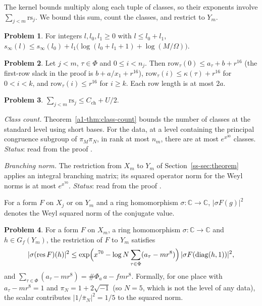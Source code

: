 \documentclass[reqno]{amsart}
\theoremstyle{definition}
\newtheorem{problem}{Problem}[section]
\theoremstyle{plain}
\theoremstyle{remark}
\newcommand{\C}{\mathbb{C}}
\newcommand{\sinf}{s_\infty}
\newcommand{\Cch}{C_{\mathrm{ch}}}
\newcommand{\row}{\mathrm{row}}
\newcommand{\diag}{\operatorname{diag}}
\newcommand{\rs}{\mathrm{rs}}
\begin{document}
The kernel bounds multiply along each tuple of classes, so their exponents involve \(\sum_{j<m}\rs_j\).  We bound this sum, count the classes, and restrict to \(Y_m\).

\begin{problem}\label{pr:jet-size-add}
For integers \(l, l_0, l_1 \ge 0\) with \(l \le l_0 + l_1\), \(\sinf(l) \le \sinf(l_0) + l_1\bigl(\log(l_0 + l_1 + 1) + \log(M/\Omega)\bigr)\).
\end{problem}

\begin{problem}\label{pr:row-bound}
Let \(j < m\), \(\tau \in \Phi\) and \(0 \le i < n_j\).  Then \(\row_\tau(0) \le a_\tau + b + r^{16}\) (the first-row slack in the proof is \(b + a/x_1 + r^{16}\)), \(\row_\tau(i) \le \kappa(\tau) + r^{16}\) for \(0 < i < k\), and \(\row_\tau(i) \le r^{16}\) for \(i \ge k\).  Each row length is at most \(2a\).
\end{problem}

\begin{problem}\label{pr:row-sum}
\(\sum_{j < m} \rs_j \le \Cch + U/2\).
\end{problem}

\emph{Class count.}  Theorem~\ref{a1-thm:class-count} bounds the number of classes at the standard level using short bases.  For the data, at a level containing the principal congruence subgroup of \(\pi_M\pi_N\), in rank at most \(n_m\), there are at most \(e^{x^{30}}\) classes.  \emph{Status}: read from the proof \cite{GL}.

\emph{Branching norm.}  The restriction from \(X_m\) to \(Y_m\) of Section~\ref{ss-sec:theorem} applies an integral branching matrix; its squared operator norm for the Weyl norms is at most \(e^{x^{70}}\).  \emph{Status}: read from the proof \cite{GL}.

For a form \(F\) on \(X_j\) or on \(Y_m\) and a ring homomorphism \(\sigma\colon \C \to \C\), \(\lvert\sigma F(g)\rvert^2\) denotes the Weyl squared norm of the conjugate value.

\begin{problem}\label{pr:restriction}
For a form \(F\) on \(X_m\), a ring homomorphism \(\sigma\colon \C \to \C\) and \(h \in G_f(Y_m)\), the restriction of \(F\) to \(Y_m\) satisfies
\[
  \lvert\sigma(\mathrm{res}\,F)(h)\rvert^2 \le \exp\Bigl(x^{70} - \log N\sum_{\tau \in \Phi}(a_\tau - mr^8)\Bigr)\,\lvert\sigma F(\diag(h, 1))\rvert^2 ,
\]
and \(\sum_{\tau \in \Phi}(a_\tau - mr^8) = \#\Phi_a\,a - fmr^8\).  Formally, for one place with \(a_\tau - mr^8 = 1\) and \(\pi_N = 1 + 2\sqrt{-1}\) (so \(N = 5\), which is not the level of any data), the scalar contributes \(\lvert 1/\bar\pi_N\rvert^2 = 1/5\) to the squared norm.
\end{problem}
\end{document}
